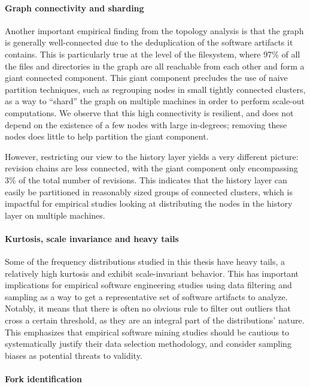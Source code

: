 \paragraph*{Graph connectivity and sharding}

Another important empirical finding from the topology analysis is that the
graph is generally well-connected due to the deduplication of the software
artifacts it contains. This is particularly true at the level of the
filesystem, where 97\% of all the files and directories in the graph are all
reachable from each other and form a giant connected component. This giant
component precludes the use of naive partition techniques, such as regrouping
nodes in small tightly connected clusters, as a way to ``shard'' the graph on
multiple machines in order to perform scale-out computations. We observe that
this high connectivity is resilient, and does not depend on the existence of a
few nodes with large in-degrees; removing these nodes does little to help
partition the giant component.

However, restricting our view to the history layer yields a very different
picture: revision chains are less connected, with the giant component only
encompassing 3\% of the total number of revisions. This indicates that the
history layer can easily be partitioned in reasonably sized groups of connected
clusters, which is impactful for empirical studies looking at distributing the
nodes in the history layer on multiple machines.

\paragraph*{Kurtosis, scale invariance and heavy tails}

Some of the frequency distributions studied in this thesis have heavy tails,
a relatively high kurtosis and exhibit scale-invariant behavior. This has
important implications for empirical software engineering studies using data
filtering and sampling as a way to get a representative set of software
artifacts to analyze. Notably, it means that there is often no obvious rule to
filter out outliers that cross a certain threshold, as they are an integral
part of the distributions' nature. This emphasizes that empirical software
mining studies should be cautious to systematically justify their data
selection methodology, and consider sampling biases as potential threats to
validity.

\paragraph*{Fork identification}

